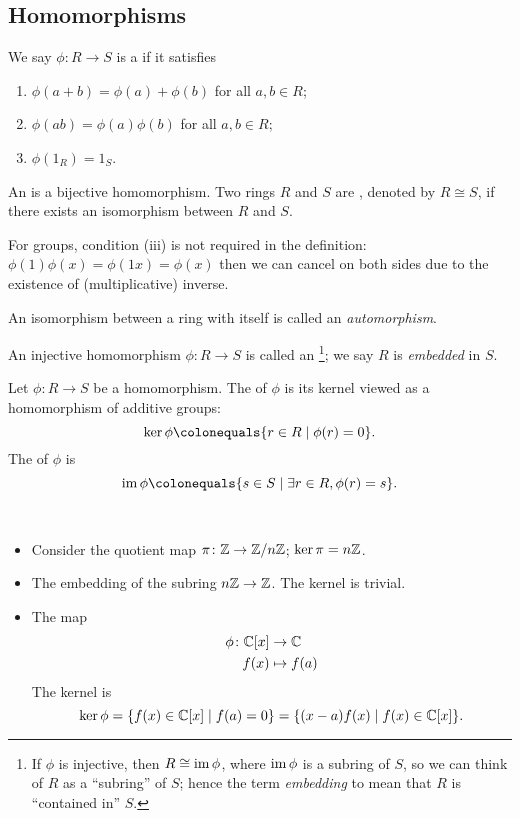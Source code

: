 \subsection{Homomorphisms}
\begin{definition}
We say $\phi\colon R\to S$ is a  if it satisfies
\begin{enumerate}[label=(\roman*)]
\item $\phi(a+b)=\phi(a)+\phi(b)$ for all $a,b\in R$;
\item $\phi(ab)=\phi(a)\phi(b)$ for all $a,b\in R$;
\item $\phi(1_R)=1_S$.
\end{enumerate}
An  is a bijective homomorphism. Two rings $R$ and $S$ are , denoted by $R\cong S$, if there exists an isomorphism between $R$ and $S$.
\end{definition}

\begin{remark}
For groups, condition (iii) is not required in the definition: $\phi(1)\phi(x)=\phi(1x)=\phi(x)$ then we can cancel on both sides due to the existence of (multiplicative) inverse.
\end{remark}

An isomorphism between a ring with itself is called an \emph{automorphism}. 

An injective homomorphism $\phi\colon R\to S$ is called an \footnote{If $\phi$ is injective, then $R\cong\operatorname{im}\phi$, where $\operatorname{im}\phi$ is a subring of $S$, so we can think of $R$ as a ``subring'' of $S$; hence the term \emph{embedding} to mean that $R$ is ``contained in'' $S$.}; we say $R$ is \emph{embedded} in $S$.

\begin{definition}
Let $\phi\colon R\to S$ be a homomorphism. The  of $\phi$ is its kernel viewed as a homomorphism of additive groups:
\[\ker\phi\colonequals\{r\in R\mid\phi(r)=0\}.\]
The  of $\phi$ is
\[\im\phi\colonequals\{s\in S\mid \exists r\in R, \phi(r)=s\}.\]
\end{definition}

\begin{example} \
\begin{itemize}
\item Consider the quotient map $\pi\colon\mathbb Z\to\mathbb Z/n\mathbb Z$; $\ker\pi=n\mathbb Z$.
\item The embedding of the subring $n\mathbb Z\to\mathbb Z$. The kernel is trivial.
\item The map 
\begin{align*}
\phi\colon\mathbb C[x]&\to\mathbb C\\
f(x)&\mapsto f(a) 
\end{align*}
The kernel is
\[\ker\phi=\{f(x)\in\mathbb C[x]\mid f(a)=0\}=\{(x-a)f(x)\mid f(x)\in\mathbb C[x]\}.\]
\end{itemize}
\end{example}


